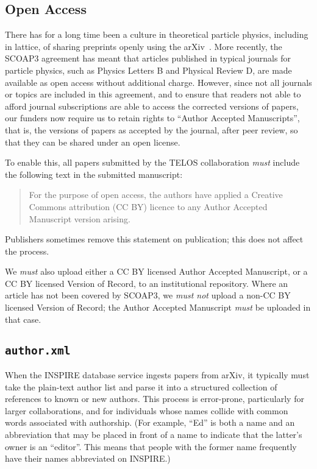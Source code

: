 \documentclass{article}
\newcommand\rfcword[1]{\emph{#1}\xspace}
\newcommand\must{\rfcword{must}}
\newcommand\mustnot{\rfcword{must not}}
\newcommand\filename[1]{\texttt{#1}\xspace}
\newcommand\authorxml{\filename{author.xml}\xspace}
\begin{document}
\subsection{Open Access}

There has for a long time been a culture in theoretical particle physics,
including in lattice,
of sharing preprints openly using the arXiv~\cite{ginsparg2021lessons}.
More recently,
the SCOAP3 agreement has meant that
articles published in
typical journals for particle physics,
such as Physics Letters B and Physical Review D,
are made available as open access without additional charge.
However,
since not all journals or topics are included in this agreement,
and to ensure
that readers not able to afford journal subscriptions
are able to access the corrected versions of papers,
our funders now require us to retain rights to
``Author Accepted Manuscripts'',
that is,
the versions of papers as accepted by the journal,
after peer review,
so that they can be shared under an open license.

To enable this,
all papers submitted by the TELOS collaboration
\must include the following text in the submitted manuscript:

\begin{quote}
  For the purpose of open access,
  the authors have applied a Creative Commons attribution (CC BY) licence
  to any Author Accepted Manuscript version arising.
\end{quote}

Publishers sometimes remove this statement on publication;
this does not affect the process.

We \must also upload either a CC BY licensed Author Accepted Manuscript,
or a CC BY licensed Version of Record,
to an institutional repository.
Where an article has not been covered by SCOAP3,
we \mustnot upload a non-CC BY licensed Version of Record;
the Author Accepted Manuscript \must be uploaded in that case.


\subsection{\authorxml}

When the INSPIRE database service ingests papers from arXiv,
it typically must take the plain-text author list
and parse it into a structured collection of references to known or new authors.
This process is error-prone,
particularly for larger collaborations,
and for individuals whose names collide with common words associated with authorship.
(For example,
``Ed'' is both a name
and an abbreviation that may be placed in front of a name
to indicate that the latter's owner is an ``editor''.
This means that people with the former name frequently have their names abbreviated on INSPIRE.)
\end{document}

